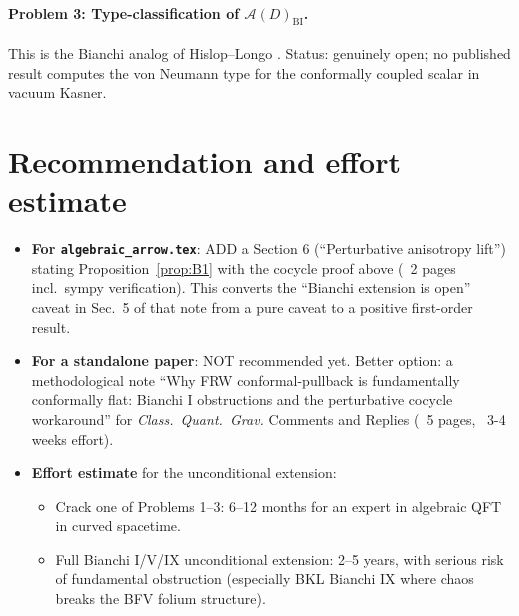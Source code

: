 \documentclass[11pt]{article}
\theoremstyle{definition}
\renewcommand{\AA}{\mathcal{A}}
\newcommand{\BI}{\mathrm{BI}}
\begin{document}
\paragraph{Problem 3: Type-classification of $\AA(D)_\BI$.}
This is the Bianchi analog of Hislop--Longo \cite{HislopLongo1982}.
Status: genuinely open; no published result computes the von Neumann
type for the conformally coupled scalar in vacuum Kasner.

\section{Recommendation and effort estimate}\label{sec:recommendation}

\begin{itemize}
\item \textbf{For \texttt{algebraic\_arrow.tex}}: ADD a Section 6
  (``Perturbative anisotropy lift'') stating Proposition~\ref{prop:B1}
  with the cocycle proof above (~2 pages incl.\ sympy verification).
  This converts the ``Bianchi extension is open'' caveat in Sec.~5 of
  that note from a pure caveat to a positive first-order result.

\item \textbf{For a standalone paper}: NOT recommended yet. Better
  option: a methodological note ``Why FRW conformal-pullback is
  fundamentally conformally flat: Bianchi I obstructions and the
  perturbative cocycle workaround'' for \emph{Class.\ Quant.\ Grav.}
  Comments and Replies (~5 pages, ~3-4 weeks effort).

\item \textbf{Effort estimate} for the unconditional extension:
  \begin{itemize}
  \item Crack one of Problems 1--3: 6--12 months for an expert in
    algebraic QFT in curved spacetime.
  \item Full Bianchi I/V/IX unconditional extension: 2--5 years, with
    serious risk of fundamental obstruction (especially BKL Bianchi IX
    where chaos breaks the BFV folium structure).
  \end{itemize}
\end{itemize}
\end{document}
